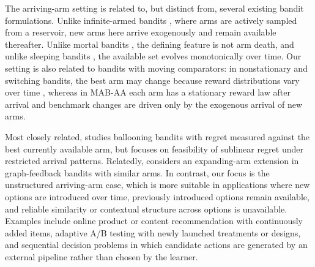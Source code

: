 \documentclass[
  12pt]{article}
\begin{document}
The arriving-arm setting is related to, but distinct from, several existing bandit formulations. Unlike infinite-armed bandits \parencite{10.1214/aos/1069362389}, where arms are actively sampled from a reservoir, new arms here arrive exogenously and remain available thereafter. Unlike mortal bandits \parencite{NIPS2008_788d9869}, the defining feature is not arm death, and unlike sleeping bandits \parencite{10.1007/s10994-010-5178-7}, the available set evolves monotonically over time. Our setting is also related to bandits with moving comparators: in nonstationary and switching bandits, the best arm may change because reward distributions vary over time \parencite{Besbes2014,Auer2019ADSWITCH}, whereas in MAB-AA each arm has a stationary reward law after arrival and benchmark changes are driven only by the exogenous arrival of new arms. 

Most closely related, \textcite{ghalme2021ballooning} studies ballooning bandits with regret measured against the best currently available arm, but focuses on feasibility of sublinear regret under restricted arrival patterns. Relatedly, \textcite{qi2025graphfeedback} considers an expanding-arm extension in graph-feedback bandits with similar arms. In contrast, our focus is the unstructured arriving-arm case, which is more suitable in applications where new options are introduced over time, previously introduced options remain available, and reliable similarity or contextual structure across options is unavailable. Examples include online product or content recommendation with continuously added items, adaptive A/B testing with newly launched treatments or designs, and sequential decision problems in which candidate actions are generated by an external pipeline rather than chosen by the learner.


\end{document}
